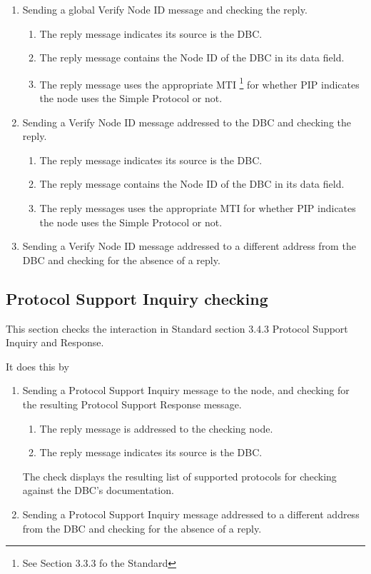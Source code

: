 \begin{enumerate}
\item Sending a global Verify Node ID message and checking the reply.
    \begin{enumerate}
    \item The reply message indicates its source is the DBC.
    \item The reply message contains the Node ID of the DBC in its data field.
    \item The reply message uses the appropriate MTI
            \footnote{See Section 3.3.3 fo the Standard}
            for whether PIP indicates the node 
            uses the Simple Protocol or not.
    \end{enumerate}

\item Sending a Verify Node ID message addressed to the DBC and checking the reply.
    \begin{enumerate}
    \item The reply message indicates its source is the DBC.
    \item The reply message contains the Node ID of the DBC in its data field.
    \item The reply messages uses the appropriate MTI for whether PIP indicates the node 
            uses the Simple Protocol or not.
    \end{enumerate}

\item Sending a Verify Node ID message addressed to a different address from the DBC
        and checking for the absence of a reply.
\end{enumerate}

\subsection{Protocol Support Inquiry checking}

This section checks the interaction in Standard section 3.4.3 Protocol Support Inquiry and Response.

It does this by 
\begin{enumerate}
\item Sending a Protocol Support Inquiry message to the node, 
and checking for the resulting Protocol Support Response message.  
    \begin{enumerate}
    \item The reply message is addressed to the checking node.
    \item The reply message indicates its source is the DBC.
    \end{enumerate}
The check displays the resulting list of supported protocols for checking against the 
DBC's documentation.

\item Sending a Protocol Support Inquiry message addressed to a different address from the DBC
        and checking for the absence of a reply.
\end{enumerate}


